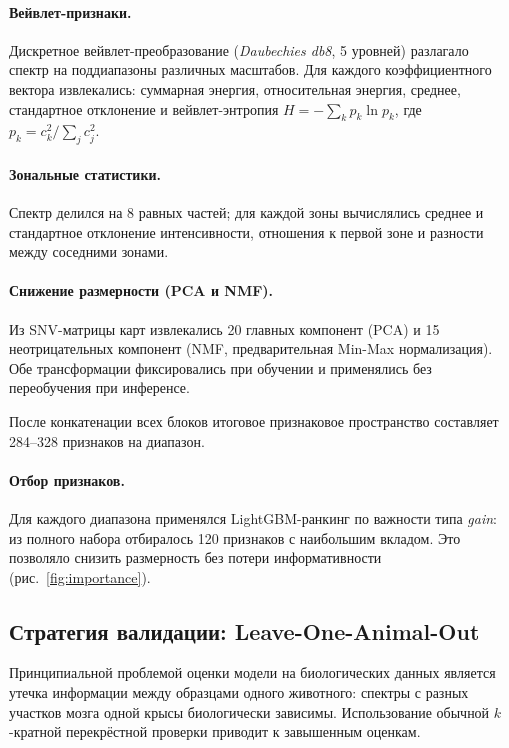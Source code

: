 \documentclass[12pt, a4paper]{article}
\begin{document}
\paragraph{Вейвлет-признаки.}
Дискретное вейвлет-преобразование (\textit{Daubechies db8}, 5 уровней)
разлагало спектр на поддиапазоны различных масштабов.
Для каждого коэффициентного вектора извлекались: суммарная энергия,
относительная энергия, среднее, стандартное отклонение и вейвлет-энтропия
$H = -\sum_k p_k \ln p_k$, где $p_k = c_k^2 / \sum_j c_j^2$.

\paragraph{Зональные статистики.}
Спектр делился на 8 равных частей; для каждой зоны вычислялись
среднее и стандартное отклонение интенсивности, отношения к первой зоне
и разности между соседними зонами.

\paragraph{Снижение размерности (PCA и NMF).}
Из SNV-матрицы карт извлекались 20 главных компонент (PCA)
и 15 неотрицательных компонент (NMF, предварительная Min-Max нормализация).
Обе трансформации фиксировались при обучении и применялись
без переобучения при инференсе.

После конкатенации всех блоков итоговое признаковое пространство
составляет 284–328 признаков на диапазон.

\paragraph{Отбор признаков.}
Для каждого диапазона применялся LightGBM-ранкинг по важности
типа \textit{gain}: из полного набора отбиралось 120 признаков
с наибольшим вкладом. Это позволяло снизить размерность без потери
информативности (рис.~\ref{fig:importance}).

\subsection{Стратегия валидации: Leave-One-Animal-Out}

Принципиальной проблемой оценки модели на биологических данных
является утечка информации между образцами одного животного:
спектры с разных участков мозга одной крысы биологически зависимы.
Использование обычной $k$-кратной перекрёстной проверки
приводит к завышенным оценкам.
\end{document}
